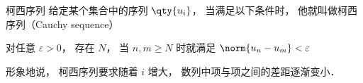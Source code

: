
\begin{definition}{柯西序列}
给定某个集合中的序列 $\qty{u_i}$， 当满足以下条件时， 他就叫做柯西序列（Cauchy sequence）

对任意 $\varepsilon > 0$， 存在 $N$， 当 $n, m \geqslant N$ 时就满足 $\norm{u_n - u_m} < \varepsilon$
\end{definition}

形象地说， 柯西序列要求随着 $i$ 增大， 数列中项与项之间的差距逐渐变小．
